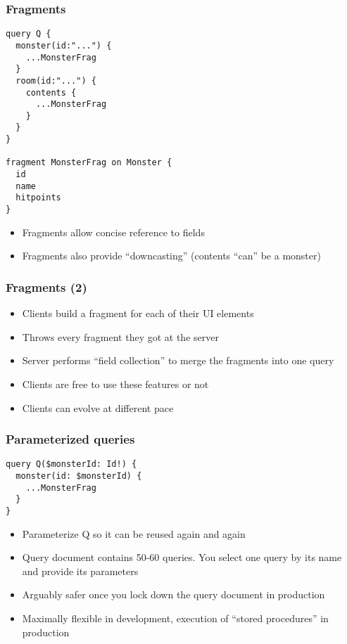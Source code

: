 \documentclass[lualatex]{beamer}
\begin{document}
\begin{frame}[fragile]
  \frametitle{Fragments}
\begin{verbatim}
query Q {
  monster(id:"...") {
    ...MonsterFrag
  }
  room(id:"...") {
    contents {
      ...MonsterFrag
    }
  }
}

fragment MonsterFrag on Monster {
  id
  name
  hitpoints
}
\end{verbatim}
\begin{itemize}
\item Fragments allow concise reference to fields
\item Fragments also provide ``downcasting'' (contents ``can'' be a
  monster)
\end{itemize}
\end{frame}

\begin{frame}
  \frametitle{Fragments (2)}
  \begin{itemize}
  \item Clients build a fragment for each of their UI elements
  \item Throws every fragment they got at the server
  \item Server performs ``field collection'' to merge the fragments
    into one query
  \item Clients are free to use these features or not
  \item Clients can evolve at different pace
  \end{itemize}
\end{frame}
\begin{frame}[fragile]
  \frametitle{Parameterized queries}
\begin{verbatim}
query Q($monsterId: Id!) {
  monster(id: $monsterId) {
    ...MonsterFrag
  }
}
\end{verbatim}
\begin{itemize}
\item Parameterize Q so it can be reused again and again
\item Query document contains 50-60 queries. You select one query by
  its name and provide its parameters
\item Arguably safer once you lock down the query document in
  production
\item Maximally flexible in development, execution of ``stored
  procedures'' in production
\end{itemize}
\end{frame}
\end{document}
